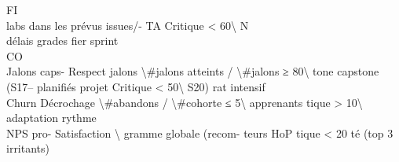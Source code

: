 \documentclass[12pt,landscape,a4paper]{article}
\begin{document}
\vspace{0.5em}
\vspace{0.5em}
\vspace{0.5em}
\vspace{0.5em}
FI\\
labs dans les       prévus                                         issues/-   TA        Critique \textless{} 60\textbackslash{}%
\vspace{0.5em}
\vspace{0.5em}
\vspace{0.5em}
\vspace{0.5em}
N\\
délais                                                             grades                                     fier sprint\\
\vspace{0.5em}
\vspace{0.5em}
CO\\
Jalons caps-  Respect jalons      \textbackslash{}#jalons atteints / \textbackslash{}#jalons   ≥ 80\textbackslash{}%
tone          capstone (S17–      planifiés                                      projet               Critique \textless{} 50\textbackslash{}%
S20)                                                                                                          rat intensif\\
Churn         Décrochage          \textbackslash{}#abandons / \textbackslash{}#cohorte         ≤ 5\textbackslash{}%
apprenants                                                                              tique \textgreater{} 10\textbackslash{}%
adaptation rythme\\
NPS pro-       Satisfaction       \textbackslash{}%
gramme         globale (recom-    teurs                                                     HoP       tique \textless{} 20            té (top 3 irritants)\\
\end{document}
